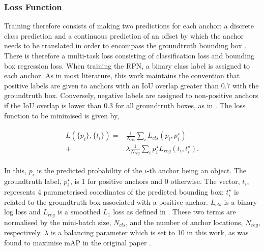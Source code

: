 \documentclass[journal]{IEEEtran}
\begin{document}
\subsubsection{Loss Function}
Training therefore consists of making two predictions for each anchor: a discrete class prediction and a continuous prediction of an offset by which the anchor needs to be translated in order to encompass the groundtruth bounding box \cite{comparisonpaper}. There is therefore a multi-task loss consisting of classification loss and bounding box regression loss. When training the RPN, a binary class label is assigned to each anchor. As in most literature, this work maintains the convention that positive labels are given to anchors with an IoU overlap greater than 0.7 with the groundtruth box. Conversely, negative labels are assigned to non-positive anchors if the IoU overlap is lower than 0.3 for all groundtruth boxes, as in \cite{fasterrcnn}. The loss function to be minimised is given by,

\begin{align}
\begin{split} %
L( \{p_{i}\} , \{t_{i}\} ) =& \frac{1}{N_{cls}} \sum_{i} L_{cls} ( p_{i} , p_{i}^{\star} )\\
+& \lambda \frac{1}{N_{reg}} \sum_{i} p_{i}^{\star} L_{reg} ( t_{i}, t_{i}^\star ).
\label{eq:loss_function}
\end{split}
\end{align}


In this, $p_{i}$ is the predicted probability of the $i$-th anchor being an object. The groundtruth label, $p_{i}^{\star}$, is 1 for positive anchors and 0 otherwise. The vector, $t_{i}$, represents 4 parameterised coordinates of the predicted bounding box; $t_{i}^{\star}$ is related to the groundtruth box associated with a positive anchor. $L_{cls}$ is a binary log loss and $L_{reg}$ is a smoothed $L_{1}$ loss as defined in \cite{fastrcnn}. These two terms are normalised by the mini-batch size, $N_{cls}$, and the number of anchor locations, $N_{reg}$, respectively. $\lambda$ is a balancing parameter which is set to 10 in this work, as was found to maximise mAP in the original paper \cite{fasterrcnn}.  
\end{document}
